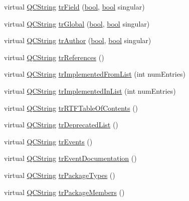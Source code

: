\begin{DoxyCompactItemize}
\item 
virtual \hyperlink{class_q_c_string}{Q\+C\+String} \hyperlink{class_translator_arabic_a50484f8c4f445796aa3e473c7c90a5df}{tr\+Field} (\hyperlink{qglobal_8h_a1062901a7428fdd9c7f180f5e01ea056}{bool}, \hyperlink{qglobal_8h_a1062901a7428fdd9c7f180f5e01ea056}{bool} singular)
\item 
virtual \hyperlink{class_q_c_string}{Q\+C\+String} \hyperlink{class_translator_arabic_a27d1fb78bcb37b60d150951b6b434ef1}{tr\+Global} (\hyperlink{qglobal_8h_a1062901a7428fdd9c7f180f5e01ea056}{bool}, \hyperlink{qglobal_8h_a1062901a7428fdd9c7f180f5e01ea056}{bool} singular)
\item 
virtual \hyperlink{class_q_c_string}{Q\+C\+String} \hyperlink{class_translator_arabic_a0250e808ef38fa180eba0595f89210ee}{tr\+Author} (\hyperlink{qglobal_8h_a1062901a7428fdd9c7f180f5e01ea056}{bool}, \hyperlink{qglobal_8h_a1062901a7428fdd9c7f180f5e01ea056}{bool} singular)
\item 
virtual \hyperlink{class_q_c_string}{Q\+C\+String} \hyperlink{class_translator_arabic_a71262664c2f41bd6ea6ce7d38e017fb4}{tr\+References} ()
\item 
virtual \hyperlink{class_q_c_string}{Q\+C\+String} \hyperlink{class_translator_arabic_ac98762581291eb3f4d940af089e38d91}{tr\+Implemented\+From\+List} (int num\+Entries)
\item 
virtual \hyperlink{class_q_c_string}{Q\+C\+String} \hyperlink{class_translator_arabic_a38d315ad4f381c2049d2607aaba3a829}{tr\+Implemented\+In\+List} (int num\+Entries)
\item 
virtual \hyperlink{class_q_c_string}{Q\+C\+String} \hyperlink{class_translator_arabic_a16112f2d3d309019839aa56d43e265fe}{tr\+R\+T\+F\+Table\+Of\+Contents} ()
\item 
virtual \hyperlink{class_q_c_string}{Q\+C\+String} \hyperlink{class_translator_arabic_a6364c3efba8cdc7bd7518b779c605ec8}{tr\+Deprecated\+List} ()
\item 
virtual \hyperlink{class_q_c_string}{Q\+C\+String} \hyperlink{class_translator_arabic_a22a39d424d0cb37428a7350d04e4448b}{tr\+Events} ()
\item 
virtual \hyperlink{class_q_c_string}{Q\+C\+String} \hyperlink{class_translator_arabic_a32c79069b0baf68aa960fb12e5eccf69}{tr\+Event\+Documentation} ()
\item 
virtual \hyperlink{class_q_c_string}{Q\+C\+String} \hyperlink{class_translator_arabic_a33836a76c01621404a4a1c6dd75193b8}{tr\+Package\+Types} ()
\item 
virtual \hyperlink{class_q_c_string}{Q\+C\+String} \hyperlink{class_translator_arabic_a8ad719e5ac01f9436a1030e353ff87ba}{tr\+Package\+Members} ()

\end{DoxyCompactItemize}
